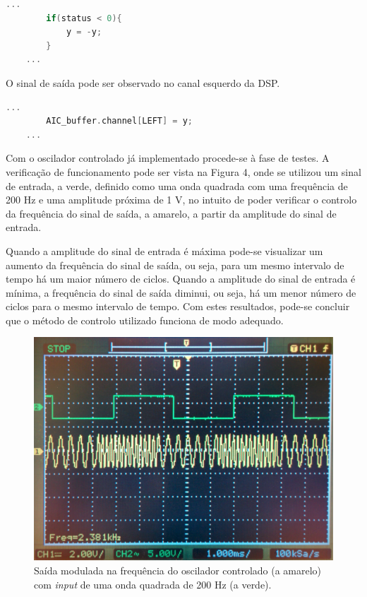 \documentclass[11pt]{article}
\numberwithin{equation}{section}
\begin{document}
\begin{lstlisting}[language=C]
	...
		if(status < 0){
			y = -y;
		}
	...
\end{lstlisting}

O sinal de saída pode ser observado no canal esquerdo da DSP.

\begin{lstlisting}[language=C]
	...
		AIC_buffer.channel[LEFT] = y;
	...
\end{lstlisting}

Com o oscilador controlado já implementado procede-se à fase de testes. A verificação de funcionamento pode ser vista na Figura 4, onde se utilizou um sinal de entrada, a verde, definido como uma onda quadrada com uma frequência de 200 Hz e uma amplitude próxima de 1 V, no intuito de poder verificar o controlo da frequência do sinal de saída, a amarelo, a partir da amplitude do sinal de entrada. 

Quando a amplitude do sinal de entrada é máxima pode-se visualizar um aumento da frequência do sinal de saída, ou seja, para um mesmo intervalo de tempo há um maior número de ciclos. Quando a amplitude do sinal de entrada é mínima, a frequência do sinal de saída diminui, ou seja, há um menor número de ciclos para o mesmo intervalo de tempo. Com estes resultados, pode-se concluir que o método de controlo utilizado funciona de modo adequado.


\begin{figure}[H]
	\centering
	\includegraphics[keepaspectratio=true, scale=0.10]{exps/200Hz_2_6}
	\caption{Saída modulada na frequência do oscilador controlado (a amarelo) com \textit{input} de uma onda quadrada de 200 Hz (a verde).}
	\vspace{-0.8em}
\end{figure}
\end{document}
